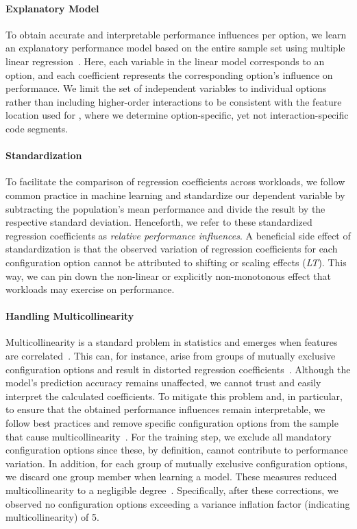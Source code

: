 {{{\paragraph*{Explanatory Model}
To obtain accurate and interpretable performance influences per option, we learn an explanatory performance model based on the entire sample set using multiple linear regression~\cite{dorn2020,siegmundPerformanceinfluenceModelsHighly2015,perLasso}. Here, each variable in the linear model corresponds to an option, and each coefficient represents the corresponding option's influence on performance. 
We limit the set of independent variables to individual options rather than including higher-order interactions to be consistent with the feature location used for , where we determine option-specific, yet not interaction-specific code segments.
\paragraph*{Standardization}
To facilitate the comparison of regression coefficients across workloads, we follow common practice in machine learning and standardize our dependent variable by subtracting the population’s mean performance and divide the result by the respective standard deviation. Henceforth, we refer to these standardized regression coefficients as \textit{relative performance influences}. A beneficial side effect of standardization is that the observed variation of regression coefficients for each configuration option cannot be attributed to shifting or scaling effects (\colorbox{lt-color!60}{\textit{LT}}). This way, we can pin down  the non-linear or explicitly non-monotonous effect that workloads may exercise on performance.
\paragraph*{Handling Multicollinearity} Multicollinearity is a standard problem in statistics and emerges when features are correlated~\cite{Daoud_2017}. This can, for instance, arise from groups of mutually exclusive configuration options and result in distorted regression coefficients~\cite{dorn2020}. Although the model's prediction accuracy remains unaffected, we cannot trust and easily interpret the calculated coefficients. To mitigate this problem and, in particular, to ensure that the obtained performance influences remain interpretable, we follow best practices and remove specific configuration options from the sample that cause multicollinearity~\cite{dorn2020}. For the training step, we exclude all mandatory configuration options since these, by definition, cannot contribute to performance variation. In addition, for each group of mutually exclusive configuration options, we discard one group member when learning a model. These measures reduced multicollinearity to a negligible degree~\cite{o2007caution}. Specifically, after these corrections, we observed no configuration options exceeding a variance inflation factor (indicating multicollinearity) of 5.


}}}
